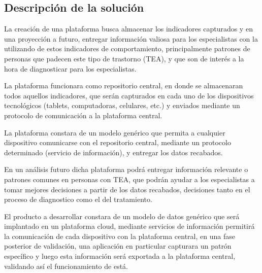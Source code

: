 \documentclass[12pt,letterpaper]{article}
\begin{document}
\subsection{Descripci\'on de la soluci\'on}


La creaci\'on de una plataforma busca almacenar  los indicadores capturados 
y en una proyecci\'on a futuro, entregar informaci\'on valiosa para los 
especialistas con la utilizando de estos indicadores de comportamiento, 
principalmente patrones de personas que padecen este tipo de trastorno (TEA),
 y que son de inter\'es a la hora de diagnosticar para los especialistas. 

La plataforma funcionara como repositorio central, en donde se 
almacenaran todos aquellos indicadores, que ser\'an capturados en 
cada uno de los dispositivos tecnol\'ogicos (tablets, computadoras, 
celulares, etc.) y enviados mediante un protocolo de comunicaci\'on 
a la plataforma central.

La plataforma constara de un modelo gen\'erico que permita a cualquier 
dispositivo comunicarse con el repositorio central, mediante un protocolo 
determinado (servicio de informaci\'on), y entregar los datos recabados.

En un an\'alisis futuro dicha plataforma podr\'a entregar informaci\'on relevante 
o patrones comunes en personas con TEA, que podr\'an ayudar a los especialistas 
a tomar mejores decisiones a partir de los datos recabados, decisiones tanto 
en el proceso de diagnostico como el del tratamiento. 

El producto a desarrollar constara de un modelo de datos gen\'erico que ser\'a 
implantado en un plataforma cloud, mediante servicios de informaci\'on permitir\'a 
la comunicaci\'on de cada dispositivo con la plataforma central, en una fase 
posterior de validaci\'on, una aplicaci\'on en particular capturara un patr\'on 
espec\'ifico y luego esta informaci\'on ser\'a exportada a la plataforma central, 
validando as\'i el funcionamiento de est\'a.

\newpage
\end{document}
